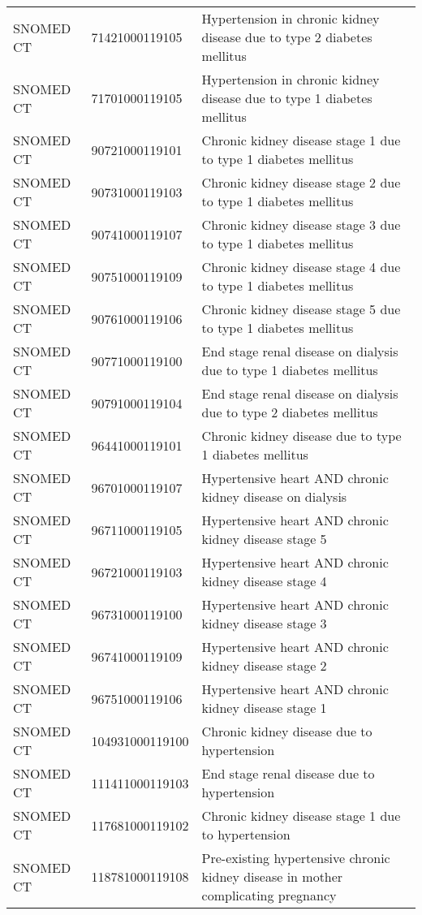 \begin{longtable}{p{}p{}p{}}
  SNOMED CT & 71421000119105 & Hypertension in chronic kidney disease due to type 2 diabetes mellitus \\ 
  SNOMED CT & 71701000119105 & Hypertension in chronic kidney disease due to type 1 diabetes mellitus \\ 
  SNOMED CT & 90721000119101 & Chronic kidney disease stage 1 due to type 1 diabetes mellitus \\ 
  SNOMED CT & 90731000119103 & Chronic kidney disease stage 2 due to type 1 diabetes mellitus \\ 
  SNOMED CT & 90741000119107 & Chronic kidney disease stage 3 due to type 1 diabetes mellitus \\ 
  SNOMED CT & 90751000119109 & Chronic kidney disease stage 4 due to type 1 diabetes mellitus \\ 
  SNOMED CT & 90761000119106 & Chronic kidney disease stage 5 due to type 1 diabetes mellitus \\ 
  SNOMED CT & 90771000119100 & End stage renal disease on dialysis due to type 1 diabetes mellitus \\ 
  SNOMED CT & 90791000119104 & End stage renal disease on dialysis due to type 2 diabetes mellitus \\ 
  SNOMED CT & 96441000119101 & Chronic kidney disease due to type 1 diabetes mellitus \\ 
  SNOMED CT & 96701000119107 & Hypertensive heart AND chronic kidney disease on dialysis \\ 
  SNOMED CT & 96711000119105 & Hypertensive heart AND chronic kidney disease stage 5 \\ 
  SNOMED CT & 96721000119103 & Hypertensive heart AND chronic kidney disease stage 4 \\ 
  SNOMED CT & 96731000119100 & Hypertensive heart AND chronic kidney disease stage 3 \\ 
  SNOMED CT & 96741000119109 & Hypertensive heart AND chronic kidney disease stage 2 \\ 
  SNOMED CT & 96751000119106 & Hypertensive heart AND chronic kidney disease stage 1 \\ 
  SNOMED CT & 104931000119100 & Chronic kidney disease due to hypertension \\ 
  SNOMED CT & 111411000119103 & End stage renal disease due to hypertension \\ 
  SNOMED CT & 117681000119102 & Chronic kidney disease stage 1 due to hypertension \\ 
  SNOMED CT & 118781000119108 & Pre-existing hypertensive chronic kidney disease in mother complicating pregnancy \\ 

\end{longtable}
